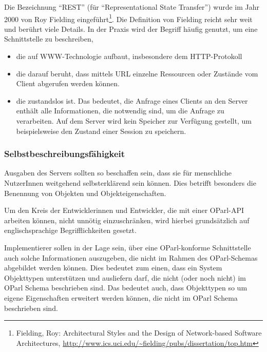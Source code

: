 \documentclass[,a4paper]{article}
\begin{document}
Die Bezeichnung ``REST'' (für ``Representational State Transfer'') wurde
im Jahr 2000 von Roy Fielding eingeführt\footnote{Fielding, Roy:
  Architectural Styles and the Design of Network-based Software
  Architectures,
  \url{http://www.ics.uci.edu/~fielding/pubs/dissertation/top.htm}}. Die
Definition von Fielding reicht sehr weit und berührt viele Details. In
der Praxis wird der Begriff häufig genutzt, um eine Schnittstelle zu
beschreiben,

\begin{itemize}
\item
  die auf WWW-Technologie aufbaut, insbesondere dem HTTP-Protokoll
\item
  die darauf beruht, dass mittels URL einzelne Ressourcen oder Zustände
  vom Client abgerufen werden können.
\item
  die zustandslos ist. Das bedeutet, die Anfrage eines Clients an den
  Server enthält alle Informationen, die notwendig sind, um die Anfrage
  zu verarbeiten. Auf dem Server wird kein Speicher zur Verfügung
  gestellt, um beispielsweise den Zustand einer Session zu speichern.
\end{itemize}

\subsubsection{Selbstbeschreibungsfähigkeit}

Ausgaben des Servers sollten so beschaffen sein, dass sie für
menschliche NutzerInnen weitgehend selbsterklärend sein können. Dies
betrifft besonders die Benennung von Objekten und Objekteigenschaften.

Um den Kreis der Entwicklerinnen und Entwickler, die mit einer OParl-API
arbeiten können, nicht unnötig einzuschränken, wird hierbei
grundsätzlich auf englischsprachige Begrifflichkeiten gesetzt.


Implementierer sollen in der Lage sein, über eine OParl-konforme
Schnittstelle auch solche Informationen auszugeben, die nicht im Rahmen
des OParl-Schemas abgebildet werden können. Dies bedeutet zum einen,
dass ein System Objekttypen unterstützen und ausliefern darf, die nicht
(oder noch nicht) im OParl Schema beschrieben sind. Das bedeutet auch,
dass Objekttypen so um eigene Eigenschaften erweitert werden können, die
nicht im OParl Schema beschrieben sind.
\end{document}
